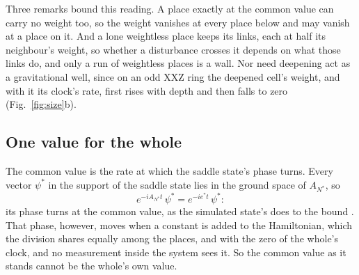\documentclass[aps,prd,reprint,superscriptaddress]{revtex4-2}
\begin{document}
Three remarks bound this reading. A place exactly at the common value can carry no weight too, so the weight vanishes at every place below and may vanish at a place on it. And a lone weightless place keeps its links, each at half its neighbour's weight, so whether a disturbance crosses it depends on what those links do, and only a run of weightless places is a wall. Nor need deepening act as a gravitational well, since on an odd XXZ ring the deepened cell's weight, and with it its clock's rate, first rises with depth and then falls to zero (Fig.~\ref{fig:size}b).

\subsection{One value for the whole}
\label{sec:readings-whole}

The common value is the rate at which the saddle state's phase turns. Every vector $\psi^*$ in the support of the saddle state lies in the ground space of $A_{N^*}$, so
\begin{equation}
  e^{-iA_{N^*}t}\, \psi^* = e^{-ie^* t}\, \psi^* :
  \label{eq:phase}
\end{equation}
its phase turns at the common value, as the simulated state's does to the bound . That phase, however, moves when a constant is added to the Hamiltonian, which the division shares equally among the places, and with the zero of the whole's clock, and no measurement inside the system sees it. So the common value as it stands cannot be the whole's own value.
\end{document}
